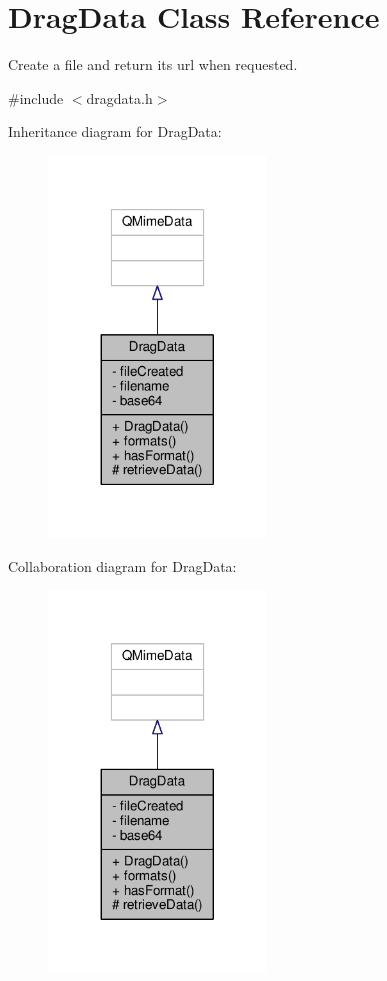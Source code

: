 \hypertarget{classDragData}{}\section{Drag\+Data Class Reference}
\label{classDragData}


Create a file and return its url when requested.  




{\ttfamily \#include $<$dragdata.\+h$>$}



Inheritance diagram for Drag\+Data\+:
\nopagebreak
\begin{figure}[H]
\begin{center}
\leavevmode
\includegraphics[width=164pt]{classDragData__inherit__graph}
\end{center}
\end{figure}


Collaboration diagram for Drag\+Data\+:
\nopagebreak
\begin{figure}[H]
\begin{center}
\leavevmode
\includegraphics[width=164pt]{classDragData__coll__graph}
\end{center}
\end{figure}
